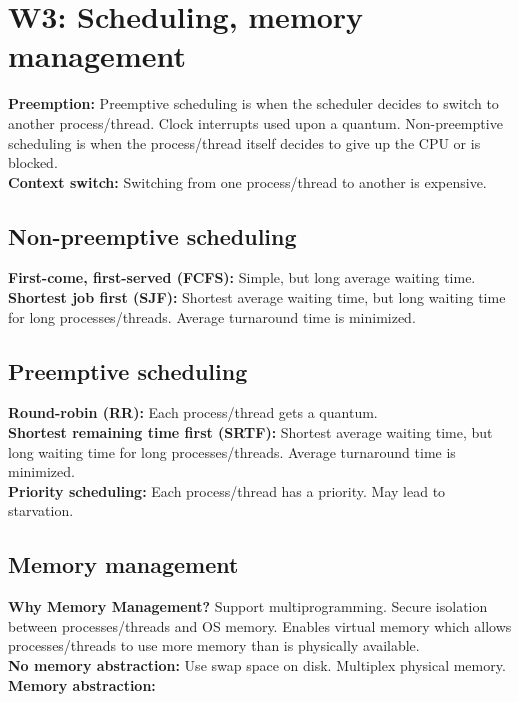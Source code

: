 \section{W3: Scheduling, memory management}
\textbf{Preemption:} Preemptive scheduling is when the scheduler decides to switch to another process/thread. Clock interrupts used upon a quantum. Non-preemptive scheduling is when the process/thread itself decides to give up the CPU or is blocked.\\
\textbf{Context switch:} Switching from one process/thread to another is expensive.\\

\subsection{Non-preemptive scheduling}
\textbf{First-come, first-served (FCFS):} Simple, but long average waiting time.\\
\textbf{Shortest job first (SJF):} Shortest average waiting time, but long waiting time for long processes/threads. Average turnaround time is minimized.\\

\subsection{Preemptive scheduling}
\textbf{Round-robin (RR):} Each process/thread gets a quantum.\\
\textbf{Shortest remaining time first (SRTF):} Shortest average waiting time, but long waiting time for long processes/threads. Average turnaround time is minimized.\\
\textbf{Priority scheduling:} Each process/thread has a priority. May lead to starvation.\\

\subsection{Memory management}
\textbf{Why Memory Management?} Support multiprogramming. Secure isolation between processes/threads and OS memory. Enables virtual memory which allows processes/threads to use more memory than is physically available.\\
\textbf{No memory abstraction:} Use swap space on disk. Multiplex physical memory.\\
\textbf{Memory abstraction:} 